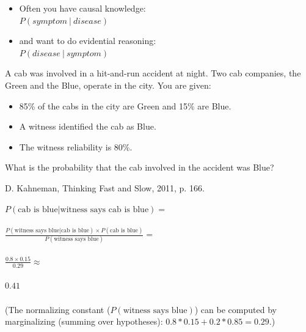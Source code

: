 \documentclass[12pt]{beamer} %
\newcommand{\figdir}{../../figures/ch06}
\begin{document}
\begin{slide}
\begin{itemize}
\item Often you have causal knowledge:\\
$P(symptom~|~disease)$\\
\item and want to do evidential reasoning:\\
$P(disease~|~symptom)$\\
\end{itemize}
\end{slide}

\begin{slide}
A cab was involved in a hit-and-run accident at night. Two cab
companies, the Green and the Blue, operate in the city. You are given:
\begin{itemize}
\item 85\% of the cabs in the city are Green and 15\% are Blue.
\item A witness identified the cab as Blue.
\item The witness reliability is 80\%.
\end{itemize}
What is the probability that the cab involved in the accident was
Blue?

\tiny{D. Kahneman, Thinking Fast and Slow, 2011, p. 166.}
\end{slide}

\begin{slide}
$P(\text{cab is blue} | \text{witness says cab is blue}) =$ \\
~\\
$\frac{P(\text{witness says blue} | \text{cab is blue}) \times P(\text{cab is blue})}{P(\text{witness says blue})} =$ \\
~\\
$\frac{0.8 \times 0.15}{0.29} \approx $\\
~\\
$0.41$\\
~\\
(The normalizing constant ($P(\text{witness says blue})$) can be computed by marginalizing (summing over hypotheses): $0.8*0.15+0.2*0.85 = 0.29$.)
\end{slide}
\end{document}
